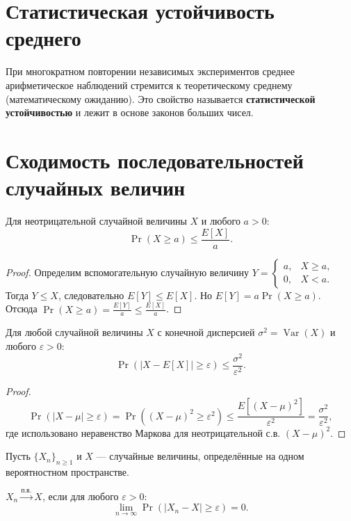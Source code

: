 \documentclass[10pt]{article}
\begin{document}
\section{Статистическая устойчивость среднего}

При многократном повторении независимых экспериментов среднее арифметическое наблюдений стремится к теоретическому среднему (математическому ожиданию). Это свойство называется \textbf{статистической устойчивостью} и лежит в основе законов больших чисел.

\section{Сходимость последовательностей случайных величин}

\begin{theorem}
Для неотрицательной случайной величины $X$ и любого $a > 0$:
\[
\Pr(X \ge a) \le \frac{E[X]}{a}.
\]
\end{theorem}
\begin{proof}
Определим вспомогательную случайную величину $Y = \begin{cases} a, & X \ge a, \\ 0, & X < a. \end{cases}$ Тогда $Y \le X$, следовательно $E[Y] \le E[X]$. Но $E[Y] = a \Pr(X \ge a)$. Отсюда $\Pr(X \ge a) = \frac{E[Y]}{a} \le \frac{E[X]}{a}$.
\end{proof}

\begin{theorem}
Для любой случайной величины $X$ с конечной дисперсией $\sigma^2 = \operatorname{Var}(X)$ и любого $\varepsilon > 0$:
\[
\Pr(|X - E[X]| \ge \varepsilon) \le \frac{\sigma^2}{\varepsilon^2}.
\]
\end{theorem}

\begin{proof}
\[
\Pr(|X - \mu| \ge \varepsilon) = \Pr((X-\mu)^2 \ge \varepsilon^2) \le \frac{E[(X-\mu)^2]}{\varepsilon^2} = \frac{\sigma^2}{\varepsilon^2},
\]
где использовано неравенство Маркова для неотрицательной с.в. $(X-\mu)^2$.
\end{proof}

Пусть $\{X_n\}_{n\ge 1}$ и $X$ — случайные величины, определённые на одном вероятностном пространстве.

\begin{definition}
$X_n \xrightarrow{\text{п.в.}} X$, если для любого $\varepsilon > 0$:
\[
\lim_{n\to\infty} \Pr(|X_n - X| \ge \varepsilon) = 0.
\]
\end{definition}
\end{document}
